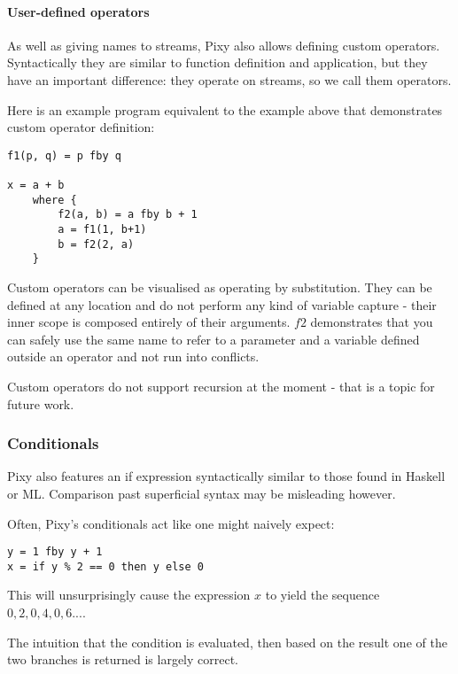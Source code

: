 \documentclass{scrartcl}
\begin{document}
    \paragraph{User-defined operators}
    
    As well as giving names to streams, Pixy also allows defining custom operators. Syntactically they are similar to function definition and application, but they have an important difference: they operate on streams, so we call them operators.
    
    Here is an example program equivalent to the example above that demonstrates custom operator definition:
    
    \begin{lstlisting}
f1(p, q) = p fby q

x = a + b
    where {
        f2(a, b) = a fby b + 1
        a = f1(1, b+1)
        b = f2(2, a)
    }
    \end{lstlisting}
    
    Custom operators can be visualised as operating by substitution. They can be defined at any location and do not perform any kind of variable capture - their inner scope is composed entirely of their arguments. $f2$ demonstrates that you can safely use the same name to refer to a parameter and a variable defined outside an operator and not run into conflicts.
    
    Custom operators do not support recursion at the moment - that is a topic for future work.
    
    \subsubsection{Conditionals}
    
    Pixy also features an if expression syntactically similar to those found in Haskell or ML. Comparison past superficial syntax may be misleading however.
    
    Often, Pixy's conditionals act like one might naively expect:
    
    \begin{lstlisting}
y = 1 fby y + 1
x = if y % 2 == 0 then y else 0
    \end{lstlisting}
    
    This will unsurprisingly cause the expression $x$ to yield the sequence $0, 2, 0, 4, 0, 6 ...$.
    
    The intuition that the condition is evaluated, then based on the result one of the two branches is returned is largely correct.
    
\end{document}
